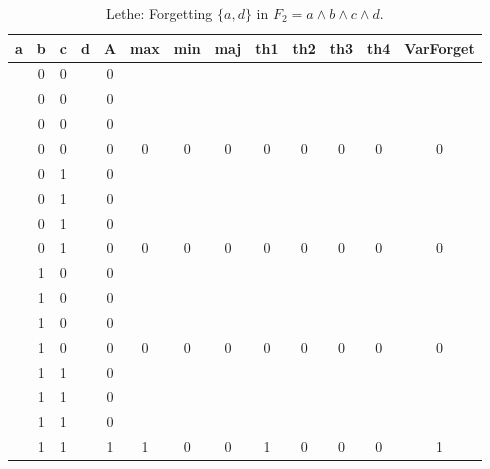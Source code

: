 \begin{table}[!tb]
    \centering
    \begin{tabular}{|c|c|c|c|c|c|c|c|c|c|c|c|c|}
        \hline
        \textbf{a} & \textbf{b} & \textbf{c} & \textbf{d} & \textbf{A} & \textbf{max} & \textbf{min} & \textbf{maj} & \textbf{th1} & \textbf{th2} & \textbf{th3} & \textbf{th4} & \textbf{VarForget} \\ \hline
        \rowcolor{gray!40}  & 0 & 0 &  & 0 &  &  &  &  &  &  &  &  \\ \hline
        \rowcolor{gray!40}  & 0 & 0 &  & 0 &  &  &  &  &  &  &  &  \\ \hline
        \rowcolor{gray!40}  & 0 & 0 &  & 0 &  &  &  &  &  &  &  &  \\ \hline
        \rowcolor{gray!40}  & 0 & 0 &  & 0 & 0 & 0 & 0 & 0 & 0 & 0 & 0 & 0 \\ \hline
        \rowcolor{blue!40}  & 0 & 1 &  & 0 &  &  &  &  &  &  &  &  \\ \hline
        \rowcolor{blue!40}  & 0 & 1 &  & 0 &  &  &  &  &  &  &  &  \\ \hline
        \rowcolor{blue!40}  & 0 & 1 &  & 0 &  &  &  &  &  &  &  &  \\ \hline
        \rowcolor{blue!40}  & 0 & 1 &  & 0 & 0 & 0 & 0 & 0 & 0 & 0 & 0 & 0 \\ \hline
        \rowcolor{red!40}  & 1 & 0 &  & 0 &  &  &  &  &  &  &  &  \\ \hline
        \rowcolor{red!40}  & 1 & 0 &  & 0 &  &  &  &  &  &  &  &  \\ \hline
        \rowcolor{red!40}  & 1 & 0 &  & 0 &  &  &  &  &  &  &  &  \\ \hline
        \rowcolor{red!40}  & 1 & 0 &  & 0 & 0 & 0 & 0 & 0 & 0 & 0 & 0 & 0 \\ \hline
        \rowcolor{green!40}  & 1 & 1 &  & 0 &  &  &  &  &  &  &  &  \\ \hline
        \rowcolor{green!40}  & 1 & 1 &  & 0 &  &  &  &  &  &  &  &  \\ \hline
        \rowcolor{green!40}  & 1 & 1 &  & 0 &  &  &  &  &  &  &  &  \\ \hline
        \rowcolor{green!40}  & 1 & 1 &  & 1 & 1 & 0 & 0 & 1 & 0 & 0 & 0 & 1 \\ \hline
    \end{tabular}
    \caption{Lethe: Forgetting $\{a, d\}$ in $F_{2} = a \land b \land c \land d$.}
    \label{tab:lethe-F2-ad}
\end{table}
